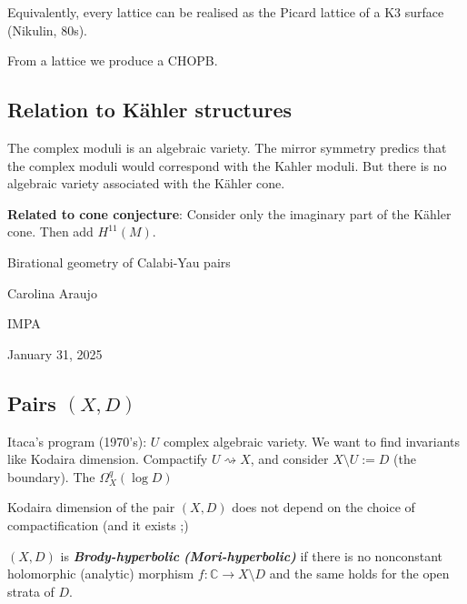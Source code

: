 Equivalently, every lattice can be realised as the Picard lattice of a K3 surface (Nikulin, 80s).

\begin{upshot}\leavevmode
	From a lattice we produce a CHOPB.
\end{upshot}


\subsection{Relation to Kähler structures}

The complex moduli is an algebraic variety. The mirror symmetry predics that the complex moduli would correspond with the Kahler moduli. But there is no algebraic variety associated with the Kähler cone.

\textbf{Related to cone conjecture}: Consider only the imaginary part of the Kähler cone. Then add $ H^{11}(M)$. 


\clearpage
{}
{\Huge Birational geometry of Calabi-Yau pairs}

\hfill{\Large Carolina Araujo}

{\Large \hfill IMPA}

\hfill{\large January 31, 2025}

\vspace{2em}
\subsection{Pairs \((X,D)\)}
Itaca's program (1970's): \(U\) complex algebraic variety. We want to find invariants like Kodaira dimension. Compactify \(U \rightsquigarrow X\), and consider \(X\setminus U:=D\) (the boundary). The \(\Omega^q_X(\operatorname{log}D)\)

\begin{thm}[Itaca, 1977]\leavevmode
Kodaira dimension of the pair \((X,D)\) does not depend on the choice of compactification (and it exists ;)
\end{thm}

\begin{defn}[Lu-Zhang, 2017]\leavevmode
\((X,D)\) is \textit{\textbf{Brody-hyperbolic}} \textit{\textbf{(Mori-hyperbolic)}} if there is no nonconstant holomorphic (analytic) morphism  \(f:\mathbb{C} \to X\setminus D\) and the same holds for the open strata of \(D\).
\end{defn}

